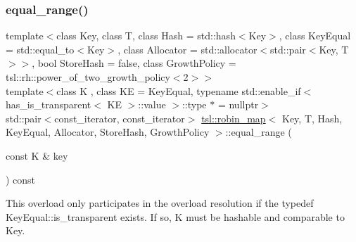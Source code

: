 \subsubsection{\texorpdfstring{equal\_range()}{equal\_range()}\hspace{0.1cm}{\footnotesize\ttfamily [5/6]}}
{\footnotesize\ttfamily template$<$class Key, class T, class Hash = std\+::hash$<$\+Key$>$, class Key\+Equal = std\+::equal\+\_\+to$<$\+Key$>$, class Allocator = std\+::allocator$<$std\+::pair$<$\+Key, T$>$$>$, bool Store\+Hash = false, class Growth\+Policy = tsl\+::rh\+::power\+\_\+of\+\_\+two\+\_\+growth\+\_\+policy$<$2$>$$>$ \\
template$<$class K , class KE  = Key\+Equal, typename std\+::enable\+\_\+if$<$ has\+\_\+is\+\_\+transparent$<$ K\+E $>$\+::value $>$\+::type $\ast$  = nullptr$>$ \\
std\+::pair$<$const\+\_\+iterator, const\+\_\+iterator$>$ \mbox{\hyperlink{classtsl_1_1robin__map}{tsl\+::robin\+\_\+map}}$<$ Key, T, Hash, Key\+Equal, Allocator, Store\+Hash, Growth\+Policy $>$\+::equal\+\_\+range (\begin{DoxyParamCaption}\item[{const K \&}]{key }\end{DoxyParamCaption}) const\hspace{0.3cm}{\ttfamily [inline]}}





This overload only participates in the overload resolution if the typedef Key\+Equal\+::is\+\_\+transparent exists. If so, K must be hashable and comparable to Key. \mbox{\label{classtsl_1_1robin__map_a28420206c36fc95862a481555dc63d1f}} 
